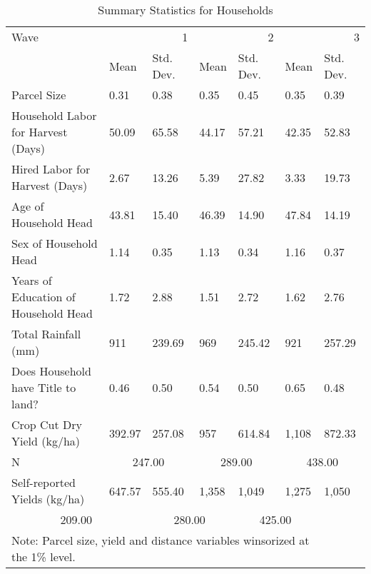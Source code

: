 \begin{table}
\caption{Summary Statistics for Households}
\label{tbl:summary}
\begin{tabular}{lllllll}
\toprule
Wave & \multicolumn{2}{r}{1} & \multicolumn{2}{r}{2} & \multicolumn{2}{r}{3} \\
 & Mean & Std. Dev. & Mean & Std. Dev. & Mean & Std. Dev. \\
\midrule
Parcel Size & 0.31 & 0.38 & 0.35 & 0.45 & 0.35 & 0.39 \\
Household Labor for Harvest (Days) & 50.09 & 65.58 & 44.17 & 57.21 & 42.35 & 52.83 \\
Hired Labor for Harvest (Days) & 2.67 & 13.26 & 5.39 & 27.82 & 3.33 & 19.73 \\
Age of Household Head & 43.81 & 15.40 & 46.39 & 14.90 & 47.84 & 14.19 \\
Sex of Household Head & 1.14 & 0.35 & 1.13 & 0.34 & 1.16 & 0.37 \\
Years of Education of Household Head & 1.72 & 2.88 & 1.51 & 2.72 & 1.62 & 2.76 \\
Total Rainfall (mm) & 911 & 239.69 & 969 & 245.42 & 921 & 257.29 \\
Does Household have Title to land? & 0.46 & 0.50 & 0.54 & 0.50 & 0.65 & 0.48 \\
Crop Cut Dry Yield (kg/ha) & 392.97 & 257.08 & 957 & 614.84 & 1,108 & 872.33 \\
\midrule
N & \multicolumn{2}{c}{247.00}&\multicolumn{2}{c}{289.00}&\multicolumn{2}{c}{438.00}\\
Self-reported Yields (kg/ha) & 647.57 & 555.40 & 1,358 & 1,049 & 1,275 & 1,050 \\
\multicolumn{2}{c}{209.00}&\multicolumn{2}{c}{280.00}&\multicolumn{2}{c}{425.00}\\
\bottomrule
\multicolumn{6}{l}{Note: Parcel size, yield and distance variables winsorized at the 1\% level.}
\end{tabular}
\end{table}
